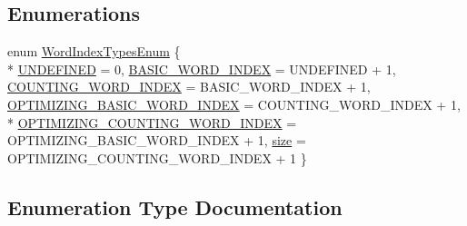 \subsection*{Enumerations}
\begin{DoxyCompactItemize}
\item 
enum \hyperlink{namespaceuva_1_1smt_1_1tries_1_1dictionary_a2d9d8547b613df614eb53c510c5223af}{Word\+Index\+Types\+Enum} \{ \\*
\hyperlink{namespaceuva_1_1smt_1_1tries_1_1dictionary_a2d9d8547b613df614eb53c510c5223afa20a86e5b38931abc7a82ecf8a8ec6e45}{U\+N\+D\+E\+F\+I\+N\+E\+D} = 0, 
\hyperlink{namespaceuva_1_1smt_1_1tries_1_1dictionary_a2d9d8547b613df614eb53c510c5223afa9d7aca4b6d0108c0e7b6b5336147f702}{B\+A\+S\+I\+C\+\_\+\+W\+O\+R\+D\+\_\+\+I\+N\+D\+E\+X} = U\+N\+D\+E\+F\+I\+N\+E\+D + 1, 
\hyperlink{namespaceuva_1_1smt_1_1tries_1_1dictionary_a2d9d8547b613df614eb53c510c5223afaea9522a585dd461e969eaecd2d0b86d5}{C\+O\+U\+N\+T\+I\+N\+G\+\_\+\+W\+O\+R\+D\+\_\+\+I\+N\+D\+E\+X} = B\+A\+S\+I\+C\+\_\+\+W\+O\+R\+D\+\_\+\+I\+N\+D\+E\+X + 1, 
\hyperlink{namespaceuva_1_1smt_1_1tries_1_1dictionary_a2d9d8547b613df614eb53c510c5223afaf2e0211e595a151b4406e638e20f0385}{O\+P\+T\+I\+M\+I\+Z\+I\+N\+G\+\_\+\+B\+A\+S\+I\+C\+\_\+\+W\+O\+R\+D\+\_\+\+I\+N\+D\+E\+X} = C\+O\+U\+N\+T\+I\+N\+G\+\_\+\+W\+O\+R\+D\+\_\+\+I\+N\+D\+E\+X + 1, 
\\*
\hyperlink{namespaceuva_1_1smt_1_1tries_1_1dictionary_a2d9d8547b613df614eb53c510c5223afa0318ba9b612a49c6e578b9961e404cd5}{O\+P\+T\+I\+M\+I\+Z\+I\+N\+G\+\_\+\+C\+O\+U\+N\+T\+I\+N\+G\+\_\+\+W\+O\+R\+D\+\_\+\+I\+N\+D\+E\+X} = O\+P\+T\+I\+M\+I\+Z\+I\+N\+G\+\_\+\+B\+A\+S\+I\+C\+\_\+\+W\+O\+R\+D\+\_\+\+I\+N\+D\+E\+X + 1, 
\hyperlink{namespaceuva_1_1smt_1_1tries_1_1dictionary_a2d9d8547b613df614eb53c510c5223afabc7f3c2d4210c2d7a45ef425cb582ef3}{size} = O\+P\+T\+I\+M\+I\+Z\+I\+N\+G\+\_\+\+C\+O\+U\+N\+T\+I\+N\+G\+\_\+\+W\+O\+R\+D\+\_\+\+I\+N\+D\+E\+X + 1
 \}
\end{DoxyCompactItemize}


\subsection{Enumeration Type Documentation}
\hypertarget{namespaceuva_1_1smt_1_1tries_1_1dictionary_a2d9d8547b613df614eb53c510c5223af}{}
